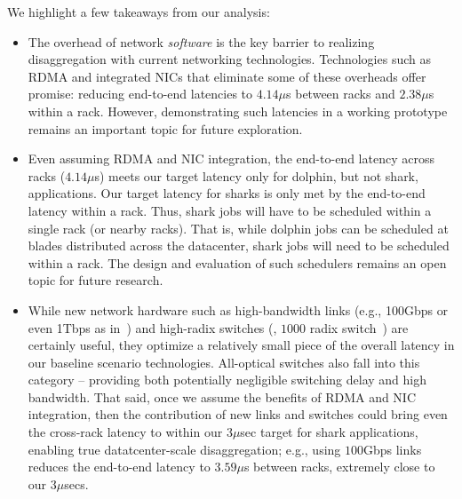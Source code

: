  We highlight a few takeaways from our analysis:
%
\begin{itemize}[leftmargin=*]
\itemsep0em
	\item The overhead of network \emph{software} is the key barrier to realizing disaggregation with current networking technologies. Technologies such as RDMA and integrated NICs that eliminate some of these overheads offer promise: reducing end-to-end latencies to $4.14\mu$s between racks and $2.38\mu$s within a rack. However, demonstrating such latencies in a working prototype remains an important topic for future exploration.
	\item Even assuming RDMA and NIC integration, the end-to-end latency across racks ($4.14\mu$s) meets our target latency only for dolphin, but not shark, applications. Our target latency for sharks is only met by the end-to-end latency within a rack. Thus, shark jobs will have to be scheduled within a single rack (or nearby racks).
	That is, while dolphin jobs can be scheduled at blades distributed across the datacenter, shark jobs will need to be scheduled within a rack. The design and evaluation of such schedulers remains an open topic for future research.
	\item While new network hardware such as high-bandwidth links (e.g., 100Gbps or even 1Tbps as in~\cite{vladimir, firebox}) and high-radix switches (\eg, $1000$ radix switch~\cite{firebox})  are certainly useful, they optimize a relatively small piece of the overall latency in our baseline scenario technologies. All-optical switches also fall into this category -- providing both potentially negligible switching delay and high bandwidth. That said, once we assume the benefits of RDMA and NIC integration, then the contribution of new links and switches could bring even the cross-rack latency to within our 3$\mu$sec target for shark applications, enabling true datatcenter-scale disaggregation; e.g., using $100$Gbps links reduces the end-to-end latency to $3.59\mu$s between racks, extremely close to our 3$\mu$secs. 

\end{itemize}
